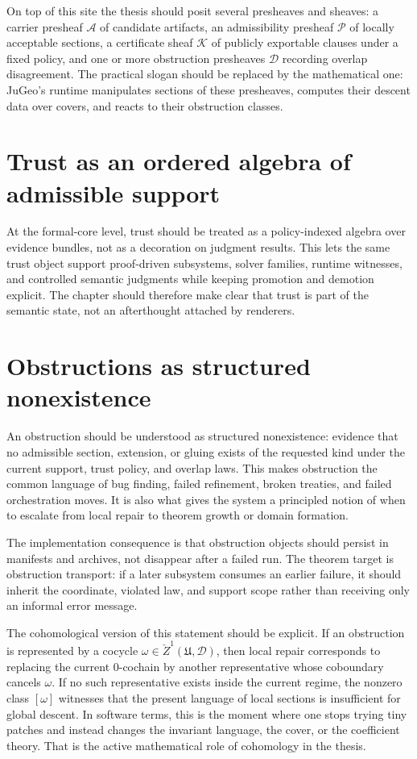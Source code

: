\documentclass[11pt]{report}
\begin{document}
On top of this site the thesis should posit several presheaves and sheaves: a carrier presheaf $\mathscr{A}$ of candidate artifacts, an admissibility presheaf $\mathscr{P}$ of locally acceptable sections, a certificate sheaf $\mathscr{K}$ of publicly exportable clauses under a fixed policy, and one or more obstruction presheaves $\mathscr{D}$ recording overlap disagreement. The practical slogan should be replaced by the mathematical one: JuGeo's runtime manipulates sections of these presheaves, computes their descent data over covers, and reacts to their obstruction classes.
\section{Trust as an ordered algebra of admissible support}
At the formal-core level, trust should be treated as a policy-indexed algebra over evidence bundles, not as a decoration on judgment results. This lets the same trust object support proof-driven subsystems, solver families, runtime witnesses, and controlled semantic judgments while keeping promotion and demotion explicit. The chapter should therefore make clear that trust is part of the semantic state, not an afterthought attached by renderers.
\section{Obstructions as structured nonexistence}
An obstruction should be understood as structured nonexistence: evidence that no admissible section, extension, or gluing exists of the requested kind under the current support, trust policy, and overlap laws. This makes obstruction the common language of bug finding, failed refinement, broken treaties, and failed orchestration moves. It is also what gives the system a principled notion of when to escalate from local repair to theorem growth or domain formation.

The implementation consequence is that obstruction objects should persist in manifests and archives, not disappear after a failed run. The theorem target is obstruction transport: if a later subsystem consumes an earlier failure, it should inherit the coordinate, violated law, and support scope rather than receiving only an informal error message.

The cohomological version of this statement should be explicit. If an obstruction is represented by a cocycle $\omega \in \check{Z}^1(\mathfrak{U},\mathscr{D})$, then local repair corresponds to replacing the current $0$-cochain by another representative whose coboundary cancels $\omega$. If no such representative exists inside the current regime, the nonzero class $[\omega]$ witnesses that the present language of local sections is insufficient for global descent. In software terms, this is the moment where one stops trying tiny patches and instead changes the invariant language, the cover, or the coefficient theory. That is the active mathematical role of cohomology in the thesis.
\end{document}
